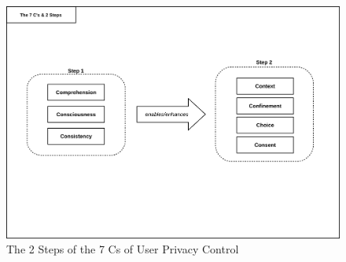 \begin{figure}
\centering
\includegraphics[width=\textwidth]{diagrams/png/7Cs2Steps.png}
\caption{The 2 Steps of the 7 Cs of User Privacy Control}
\label{figure:The 2 Steps of the 7 Cs of User Privacy Control}
\end{figure}
